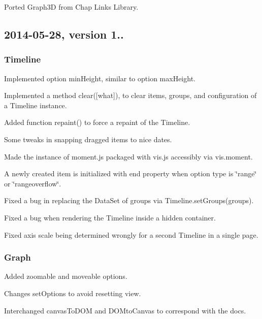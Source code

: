 \begin{DoxyItemize}
\item Ported Graph3D from Chap Links Library.
\end{DoxyItemize}

\subsection*{2014-\/05-\/28, version 1..}

\subsubsection*{Timeline}


\begin{DoxyItemize}
\item Implemented option {\ttfamily min\+Height}, similar to option {\ttfamily max\+Height}.
\item Implemented a method {\ttfamily clear(\mbox{[}what\mbox{]})}, to clear items, groups, and configuration of a Timeline instance.
\item Added function {\ttfamily repaint()} to force a repaint of the Timeline.
\item Some tweaks in snapping dragged items to nice dates.
\item Made the instance of moment.\+js packaged with vis.\+js accessibly via {\ttfamily vis.\+moment}.
\item A newly created item is initialized with {\ttfamily end} property when option {\ttfamily type} is {\ttfamily \char`\"{}range\char`\"{}} or {\ttfamily \char`\"{}rangeoverflow\char`\"{}}.
\item Fixed a bug in replacing the Data\+Set of groups via {\ttfamily Timeline.\+set\+Groups(groups)}.
\item Fixed a bug when rendering the Timeline inside a hidden container.
\item Fixed axis scale being determined wrongly for a second Timeline in a single page.
\end{DoxyItemize}

\subsubsection*{Graph}


\begin{DoxyItemize}
\item Added zoomable and moveable options.
\item Changes set\+Options to avoid resetting view.
\item Interchanged canvas\+To\+D\+OM and D\+O\+Mto\+Canvas to correspond with the docs.
\end{DoxyItemize}

